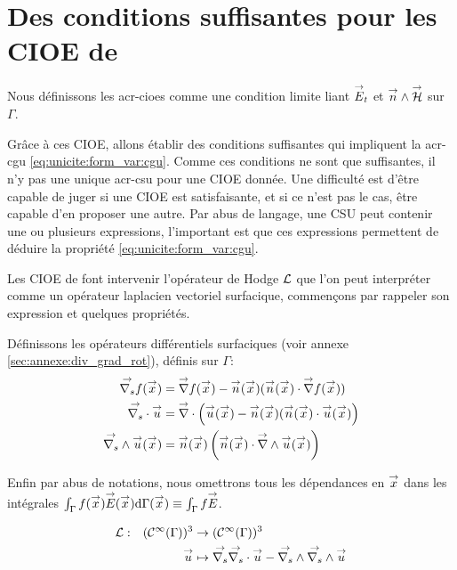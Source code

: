 \section[Des CSU pour les CIOE de Stupfel et Poget 2011]{Des conditions suffisantes pour les CIOE de \cite{stupfel_sufficient_2011}}

  Nous définissons les \glspl{acr-cioe} comme une condition limite liant \(\vE_t\) et \(\vn\pvect\vH\) sur \(\Gamma\).

  Grâce à ces CIOE, allons établir des conditions suffisantes qui impliquent la \gls{acr-cgu} \eqref{eq:unicite:form_var:cgu}. Comme ces conditions ne sont que suffisantes, il n'y pas une unique \gls{acr-csu} pour une CIOE donnée. Une difficulté est d'être capable de juger si une CIOE est satisfaisante, et si ce n'est pas le cas, être capable d'en proposer une autre. Par abus de langage, une CSU peut contenir une ou plusieurs expressions, l'important est que ces expressions permettent de déduire la propriété \eqref{eq:unicite:form_var:cgu}.

  Les CIOE de \cite{stupfel_sufficient_2011} font intervenir l'opérateur de Hodge \(\LL\) que l'on peut interpréter comme un opérateur laplacien vectoriel surfacique, commençons par rappeler son expression et quelques propriétés.

  Définissons les opérateurs différentiels surfaciques (voir annexe \ref{sec:annexe:div_grad_rot}), définis sur \(\Gamma\):
  \begin{align*}
      \vgrads{f}(\vx) &= \vgrad{f}(\vx) - \vn(\vx) (\vn(\vx) \cdot \vgrad{f}(\vx))
      \\
      \vdivs{\vu} &= \vdiv\left(\vu(\vx) - \vn(\vx) (\vn(\vx) \cdot \vu(\vx)\right)
      \\
      \vrots{\vu}(\vx) &= \vn(\vx)\left(\vn(\vx) \cdot \vrot{\vu}(\vx)\right)
  \end{align*}


  Enfin par abus de notations, nous omettrons tous les dépendances en \(\vx\) dans les intégrales \(\int_\Gamma f(\vx)\vE(\vx)\dd{\Gamma(\vx)}\equiv \int_\Gamma f\vE\).
  \begin{defn}
    \label{def:operator:L}
    \begin{equation*}
        \fonction{\LL}{(\mathcal{C}^\infty(\Gamma))^3}{(\mathcal{C}^\infty(\Gamma))^3}%
          {\vu}{\vgrads{\vdivs \vu} - \vrots{\vrots \vu}}
    \end{equation*}
  \end{defn}

